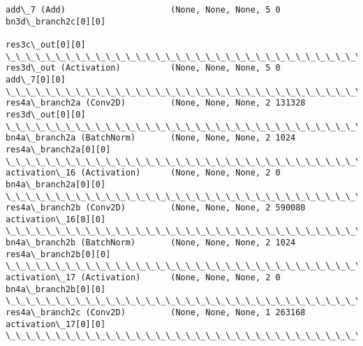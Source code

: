 \documentclass[11pt]{article}
\begin{document}
\begin{Verbatim}[commandchars=\\\{\}]
add\_7 (Add)                     (None, None, None, 5 0           bn3d\_branch2c[0][0]              
                                                                 res3c\_out[0][0]                  
\_\_\_\_\_\_\_\_\_\_\_\_\_\_\_\_\_\_\_\_\_\_\_\_\_\_\_\_\_\_\_\_\_\_\_\_\_\_\_\_\_\_\_\_\_\_\_\_\_\_\_\_\_\_\_\_\_\_\_\_\_\_\_\_\_\_\_\_\_\_\_\_\_\_\_\_\_\_\_\_\_\_\_\_\_\_\_\_\_\_\_\_\_\_\_\_\_\_
res3d\_out (Activation)          (None, None, None, 5 0           add\_7[0][0]                      
\_\_\_\_\_\_\_\_\_\_\_\_\_\_\_\_\_\_\_\_\_\_\_\_\_\_\_\_\_\_\_\_\_\_\_\_\_\_\_\_\_\_\_\_\_\_\_\_\_\_\_\_\_\_\_\_\_\_\_\_\_\_\_\_\_\_\_\_\_\_\_\_\_\_\_\_\_\_\_\_\_\_\_\_\_\_\_\_\_\_\_\_\_\_\_\_\_\_
res4a\_branch2a (Conv2D)         (None, None, None, 2 131328      res3d\_out[0][0]                  
\_\_\_\_\_\_\_\_\_\_\_\_\_\_\_\_\_\_\_\_\_\_\_\_\_\_\_\_\_\_\_\_\_\_\_\_\_\_\_\_\_\_\_\_\_\_\_\_\_\_\_\_\_\_\_\_\_\_\_\_\_\_\_\_\_\_\_\_\_\_\_\_\_\_\_\_\_\_\_\_\_\_\_\_\_\_\_\_\_\_\_\_\_\_\_\_\_\_
bn4a\_branch2a (BatchNorm)       (None, None, None, 2 1024        res4a\_branch2a[0][0]             
\_\_\_\_\_\_\_\_\_\_\_\_\_\_\_\_\_\_\_\_\_\_\_\_\_\_\_\_\_\_\_\_\_\_\_\_\_\_\_\_\_\_\_\_\_\_\_\_\_\_\_\_\_\_\_\_\_\_\_\_\_\_\_\_\_\_\_\_\_\_\_\_\_\_\_\_\_\_\_\_\_\_\_\_\_\_\_\_\_\_\_\_\_\_\_\_\_\_
activation\_16 (Activation)      (None, None, None, 2 0           bn4a\_branch2a[0][0]              
\_\_\_\_\_\_\_\_\_\_\_\_\_\_\_\_\_\_\_\_\_\_\_\_\_\_\_\_\_\_\_\_\_\_\_\_\_\_\_\_\_\_\_\_\_\_\_\_\_\_\_\_\_\_\_\_\_\_\_\_\_\_\_\_\_\_\_\_\_\_\_\_\_\_\_\_\_\_\_\_\_\_\_\_\_\_\_\_\_\_\_\_\_\_\_\_\_\_
res4a\_branch2b (Conv2D)         (None, None, None, 2 590080      activation\_16[0][0]              
\_\_\_\_\_\_\_\_\_\_\_\_\_\_\_\_\_\_\_\_\_\_\_\_\_\_\_\_\_\_\_\_\_\_\_\_\_\_\_\_\_\_\_\_\_\_\_\_\_\_\_\_\_\_\_\_\_\_\_\_\_\_\_\_\_\_\_\_\_\_\_\_\_\_\_\_\_\_\_\_\_\_\_\_\_\_\_\_\_\_\_\_\_\_\_\_\_\_
bn4a\_branch2b (BatchNorm)       (None, None, None, 2 1024        res4a\_branch2b[0][0]             
\_\_\_\_\_\_\_\_\_\_\_\_\_\_\_\_\_\_\_\_\_\_\_\_\_\_\_\_\_\_\_\_\_\_\_\_\_\_\_\_\_\_\_\_\_\_\_\_\_\_\_\_\_\_\_\_\_\_\_\_\_\_\_\_\_\_\_\_\_\_\_\_\_\_\_\_\_\_\_\_\_\_\_\_\_\_\_\_\_\_\_\_\_\_\_\_\_\_
activation\_17 (Activation)      (None, None, None, 2 0           bn4a\_branch2b[0][0]              
\_\_\_\_\_\_\_\_\_\_\_\_\_\_\_\_\_\_\_\_\_\_\_\_\_\_\_\_\_\_\_\_\_\_\_\_\_\_\_\_\_\_\_\_\_\_\_\_\_\_\_\_\_\_\_\_\_\_\_\_\_\_\_\_\_\_\_\_\_\_\_\_\_\_\_\_\_\_\_\_\_\_\_\_\_\_\_\_\_\_\_\_\_\_\_\_\_\_
res4a\_branch2c (Conv2D)         (None, None, None, 1 263168      activation\_17[0][0]              
\_\_\_\_\_\_\_\_\_\_\_\_\_\_\_\_\_\_\_\_\_\_\_\_\_\_\_\_\_\_\_\_\_\_\_\_\_\_\_\_\_\_\_\_\_\_\_\_\_\_\_\_\_\_\_\_\_\_\_\_\_\_\_\_\_\_\_\_\_\_\_\_\_\_\_\_\_\_\_\_\_\_\_\_\_\_\_\_\_\_\_\_\_\_\_\_\_\_

\end{Verbatim}
\end{document}
